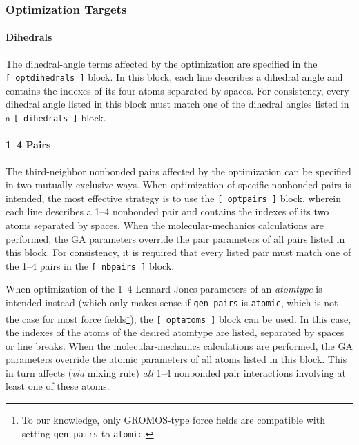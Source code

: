 \documentclass[10pt,a4paper,openany]{memoir}
\numberwithin{equation}{section}
\begin{document}
\subsubsection{Optimization Targets}
\label{sec:stp-optterms}

\paragraph{Dihedrals}

The dihedral-angle terms affected by the optimization are specified in
the \texttt{[~optdihedrals~]} block.  In this block, each line
describes a dihedral angle and contains the indexes of its four atoms
separated by spaces. For consistency, every dihedral angle listed in this
block must match one of the dihedral angles listed in a
\texttt{[~dihedrals~]} block.


\paragraph{1--4 Pairs}

The third-neighbor nonbonded pairs affected by the optimization can be specified in two mutually exclusive ways.
When optimization of specific nonbonded pairs is intended, the most effective strategy is to use the \texttt{[~optpairs~]} block, wherein each line describes a 1--4 nonbonded pair and contains the indexes of its two atoms separated by spaces.
When the molecular-mechanics calculations are performed, the GA parameters override the pair parameters of all pairs listed in this block.
For consistency, it is required that every listed pair must match one of the 1--4 pairs in the \texttt{[~nbpairs~]} block.

When optimization of the 1--4 Lennard-Jones parameters of an \textit{atomtype} is intended instead (which only makes sense if \texttt{gen-pairs} is \texttt{atomic}, which is
    not the case for most force fields\footnote{To our knowledge, only GROMOS-type force fields are compatible with setting \texttt{gen-pairs} to \texttt{atomic}.}), the \texttt{[~optatoms~]} block can be used.
In this case, the indexes of the atoms of the desired atomtype are listed, separated by spaces or line breaks.
When the molecular-mechanics calculations are performed, the GA parameters override the atomic parameters of all atoms listed in this block.
This in turn affects (\textit{via} mixing rule) \textit{all} 1--4 nonbonded pair interactions involving at least one of these atoms.
\end{document}
